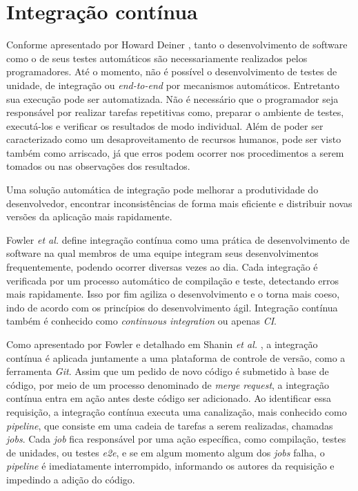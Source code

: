 \hypertarget{integracao-continua}{%
\section{Integração contínua}\label{integracao-continua}}

Conforme apresentado por Howard Deiner \cite{deiner}, tanto o desenvolvimento de software como o de seus testes automáticos são necessariamente realizados pelos programadores. Até o momento, não é possível o desenvolvimento de testes de unidade, de integração ou \emph{end-to-end} por mecanismos automáticos. Entretanto sua execução pode ser automatizada. Não é necessário que o programador seja responsável por realizar tarefas repetitivas como, preparar o ambiente de testes, executá-los e verificar os resultados de modo individual. Além de poder ser caracterizado como um desaproveitamento de recursos humanos, pode ser visto também como arriscado, já que erros podem ocorrer nos procedimentos a serem tomados ou nas observações dos resultados.

Uma solução automática de integração pode melhorar a produtividade do desenvolvedor, encontrar inconsistências de forma mais eficiente e distribuir novas versões da aplicação mais rapidamente.

Fowler \emph{et al.} \cite{fowler} define integração contínua como uma prática de desenvolvimento de software na qual membros de uma equipe integram seus desenvolvimentos frequentemente, podendo ocorrer diversas vezes ao dia. Cada integração é verificada por um processo automático de compilação e teste, detectando erros mais rapidamente. Isso por fim agiliza o desenvolvimento e o torna mais coeso, indo de acordo com os princípios do desenvolvimento ágil. Integração contínua também é conhecido como \emph{continuous integration} ou apenas \emph{CI}.

Como apresentado por Fowler e detalhado em Shanin \emph{et al.} \cite{shahin}, a integração contínua é aplicada juntamente a uma plataforma de controle de versão, como a ferramenta \emph{Git}. Assim que um pedido de novo código é submetido à base de código, por meio de um processo denominado de \emph{merge request}, a integração contínua entra em ação antes deste código ser adicionado. Ao identificar essa requisição, a integração contínua executa uma canalização, mais conhecido como \emph{pipeline}, que consiste em uma cadeia de tarefas a serem realizadas, chamadas \emph{jobs}. Cada \emph{job} fica responsável por uma ação específica, como compilação, testes de unidades, ou testes \emph{e2e}, e se em algum momento algum dos \emph{jobs} falha, o \emph{pipeline} é imediatamente interrompido, informando os autores da requisição e impedindo a adição do código.

